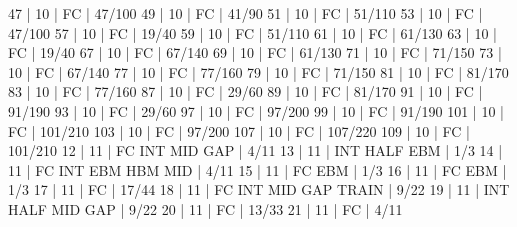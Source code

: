 47    |  10    |    FC                                        | 47/100   
49    |  10    |    FC                                        | 41/90   
51    |  10    |    FC                                        | 51/110   
53    |  10    |    FC                                        | 47/100   
57    |  10    |    FC                                        | 19/40   
59    |  10    |    FC                                        | 51/110   
61    |  10    |    FC                                        | 61/130   
63    |  10    |    FC                                        | 19/40   
67    |  10    |    FC                                        | 67/140   
69    |  10    |    FC                                        | 61/130   
71    |  10    |    FC                                        | 71/150   
73    |  10    |    FC                                        | 67/140   
77    |  10    |    FC                                        | 77/160   
79    |  10    |    FC                                        | 71/150   
81    |  10    |    FC                                        | 81/170   
83    |  10    |    FC                                        | 77/160   
87    |  10    |    FC                                        | 29/60   
89    |  10    |    FC                                        | 81/170   
91    |  10    |    FC                                        | 91/190   
93    |  10    |    FC                                        | 29/60   
97    |  10    |    FC                                        | 97/200   
99    |  10    |    FC                                        | 91/190   
101   |  10    |    FC                                        | 101/210   
103   |  10    |    FC                                        | 97/200   
107   |  10    |    FC                                        | 107/220   
109   |  10    |    FC                                        | 101/210   
12    |  11    |    FC  INT                  MID  GAP         | 4/11   
13    |  11    |        INT  HALF  EBM                        | 1/3   
14    |  11    |    FC  INT        EBM  HBM  MID              | 4/11   
15    |  11    |    FC             EBM                        | 1/3   
16    |  11    |    FC             EBM                        | 1/3   
17    |  11    |    FC                                        | 17/44   
18    |  11    |    FC  INT                  MID  GAP  TRAIN  | 9/22   
19    |  11    |        INT  HALF            MID  GAP         | 9/22   
20    |  11    |    FC                                        | 13/33   
21    |  11    |    FC                                        | 4/11   
